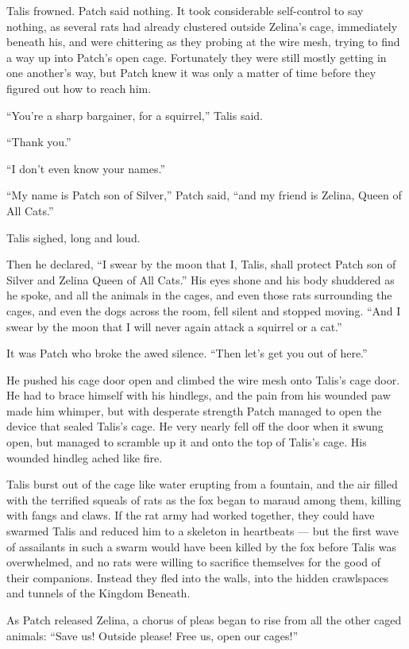 \documentclass[12pt]{memoir}
\begin{document}
Talis frowned. Patch said nothing. It took considerable self-control
to say nothing, as several rats had already clustered outside Zelina’s
cage, immediately beneath his, and were chittering as they probing at
the wire mesh, trying to find a way up into Patch’s open
cage. Fortunately they were still mostly getting in one another’s way,
but Patch knew it was only a matter of time before they figured out
how to reach him.

“You’re a sharp bargainer, for a squirrel,” Talis said.

“Thank you.”

“I don’t even know your names.”

“My name is Patch son of Silver,” Patch said, “and my friend is
Zelina, Queen of All Cats.”

Talis sighed, long and loud.

Then he declared, “I swear by the moon that I, Talis, shall protect
Patch son of Silver and Zelina Queen of All Cats.” His eyes shone and
his body shuddered as he spoke, and all the animals in the cages, and
even those rats surrounding the cages, and even the dogs across the
room, fell silent and stopped moving. “And I swear by the moon that I
will never again attack a squirrel or a cat.”

It was Patch who broke the awed silence. “Then let’s get you out of
here.”

He pushed his cage door open and climbed the wire mesh onto Talis’s
cage door. He had to brace himself with his hindlegs, and the pain
from his wounded paw made him whimper, but with desperate strength
Patch managed to open the device that sealed Talis’s cage. He very
nearly fell off the door when it swung open, but managed to scramble
up it and onto the top of Talis’s cage. His wounded hindleg ached like
fire.

Talis burst out of the cage like water erupting from a fountain, and
the air filled with the terrified squeals of rats as the fox began to
maraud among them, killing with fangs and claws. If the rat army had
worked together, they could have swarmed Talis and reduced him to a
skeleton in heartbeats — but the first wave of assailants in such a
swarm would have been killed by the fox before Talis was overwhelmed,
and no rats were willing to sacrifice themselves for the good of their
companions. Instead they fled into the walls, into the hidden
crawlspaces and tunnels of the Kingdom Beneath.

As Patch released Zelina, a chorus of pleas began to rise from all the
other caged animals: “Save us! Outside please! Free us, open our
cages!”
\end{document}
